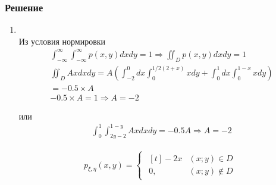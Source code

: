 \documentclass[12pt]{article}
\begin{document}
\subsubsection*{Решение}

\begin{enumerate}
	\item \mbox{}\\
	      Из условия нормировки
	      \begin{gather*}
		      \int_{-\infty}^{\infty}\int_{-\infty}^{\infty}p(x,y)dxdy = 1 \Rightarrow \iint_{D}p(x,y)dxdy = 1 \\
		      \iint_{D}Axdxdy =
		      A\left(\int_{-2}^{0}dx\int_{0}^{1/2(2 + x)}xdy + \int_{0}^{1}dx\int_{0}^{1 - x}xdy \right) \\
		      = -0.5 \times A \\
		      -0.5 \times A = 1 \Rightarrow A = -2
	      \end{gather*}

	      или
	      \begin{gather*}
		      \int_{0}^{1}\int_{2y-2}^{1-y} Ax dxdy = -0.5A \Rightarrow A = -2
	      \end{gather*}

	      \begin{gather*}
		      p_{\xi,\eta}(x,y) =
		      \begin{cases}
			      \begin{aligned}[t]
				      -2x & (x;y) \in D    \\
				      0,  & (x;y) \notin D
			      \end{aligned}
		      \end{cases}
	      \end{gather*}


\end{enumerate}
\end{document}
